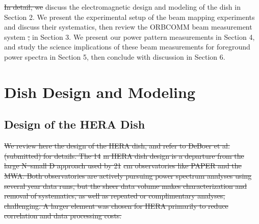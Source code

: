 \documentclass{emulateapj}
\providecommand{\DIFadd}[1]{{\protect\color{blue}\uwave{#1}}} %
\providecommand{\DIFdel}[1]{{\protect\color{red}\sout{#1}}}                      %
\providecommand{\DIFaddbegin}{} %
\providecommand{\DIFaddend}{} %
\providecommand{\DIFdelbegin}{} %
\providecommand{\DIFdelend}{} %
\begin{document}
\DIFdelbegin \DIFdel{In detail, we }\DIFdelend \DIFaddbegin \DIFadd{We }\DIFaddend discuss the electromagnetic design and modeling of the dish in Section 2. We present the 
experimental setup of the beam mapping experiments and discuss their systematics, then 
review the ORBCOMM beam measurement system \DIFdelbegin \DIFdel{, }\DIFdelend in Section 3. We present our power pattern 
measurements in Section 4, and study the science implications of these beam measurements for foreground power spectra in Section 5, then conclude with discussion in Section 6.

\section{Dish Design and Modeling}

\subsection{Design of the HERA Dish}

\DIFdelbegin \DIFdel{We review here the design of the HERA dish, and refer to DeBoer et al. (submitted) for details. 
The 14}%
\DIFdel{m HERA dish design is a departure from the large N--small D approach used by 21}%
\DIFdel{cm 
observatories like PAPER and the MWA. Both observatories are actively pursuing power 
spectrum analyses using several year data runs, but the sheer data volume makes 
characterization and removal of systematics, as well as repeated or complimentary analyses, 
challenging. A larger element was chosen for HERA primarily to reduce correlation and data processing costs. }%
\end{document}
